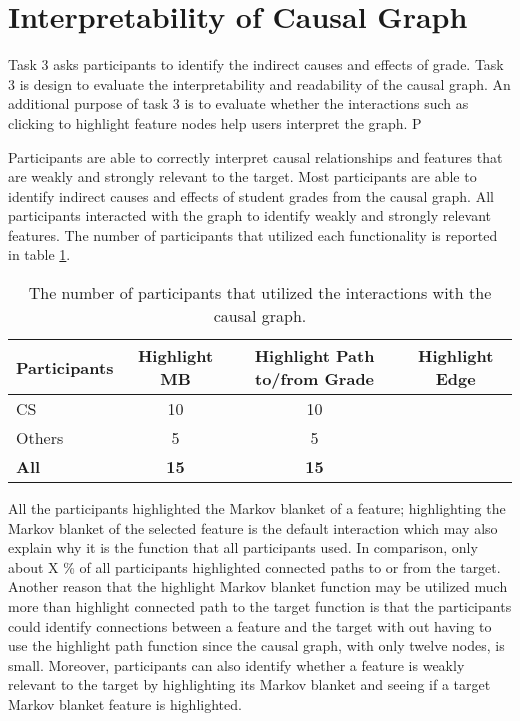 \section {Interpretability of Causal Graph}
Task 3 asks participants to identify the indirect causes and effects of grade. Task 3 is design to evaluate the interpretability and readability of the causal graph. An additional purpose of task 3 is to evaluate whether the interactions such as clicking to highlight feature nodes help users interpret the graph. P

Participants are able to correctly interpret causal relationships and features that are weakly and strongly relevant to the target. Most participants are able to identify indirect causes and effects of student grades from the causal graph. All participants interacted with the graph to identify weakly and strongly relevant features. The number of participants that utilized each functionality is reported in table \ref{GraphInteractions}.

\begin{table}[]
\centering
\begin{tabular}{lccc}
\hline
Participants & Highlight MB & Highlight Path to/from Grade & Highlight Edge \\ \hline
CS           & 10           & 10                           &                \\
Others       & 5            & 5                            &                \\ \hline
\textbf{All} & \textbf{15}  & \textbf{15}                  &  \textbf{}        \\ \hline
\end{tabular}
\caption{The number of participants that utilized the interactions with the causal graph. }
\label{GraphInteractions}
\end{table}

All the participants highlighted the Markov blanket of a feature; highlighting the Markov blanket of the selected feature is the default interaction which may also explain why it is the function that all participants used. In comparison, only about X \% of all participants highlighted connected paths to or from the target. Another reason that the highlight Markov blanket function may be utilized much more than highlight connected path to the target function is that the participants could identify connections between a feature and the target with out having to use the highlight path function since the causal graph, with only twelve nodes, is small. Moreover, participants can also identify whether a feature is weakly relevant to the target by highlighting its Markov blanket and seeing if a target Markov blanket feature is highlighted.

